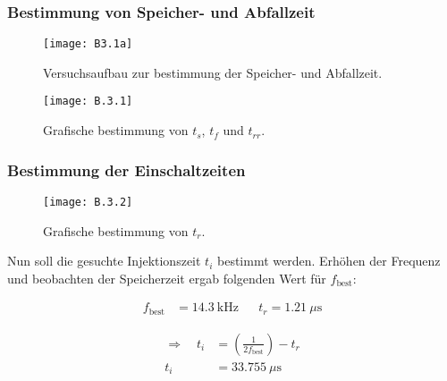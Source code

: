 \documentclass[
	a4paper, %
	12pt, %
]{CSUniSchoolLabReport}
\newcommand{\micro}{\ensuremath{\mu}}
\begin{document}
\subsubsection{Bestimmung von Speicher- und Abfallzeit}

\begin{figure}[H] %
	\centering %
	\texttt{[image: B3.1a]} %
	\caption{Versuchsaufbau zur bestimmung der Speicher- und Abfallzeit.}
	\vspace{1em}
\end{figure}

\begin{figure}[H] %
	\centering %
	\texttt{[image: B.3.1]} %
	\caption{Grafische bestimmung von $t_s$, $t_f$ und $t_{rr}$.}
\end{figure}

\subsubsection{Bestimmung der Einschaltzeiten}
\begin{figure}[H] %
	\centering %
	\texttt{[image: B.3.2]} %
	\caption{Grafische bestimmung von $t_r$.}
	\vspace{1em}
\end{figure}

Nun soll die gesuchte Injektionszeit $t_i$ bestimmt werden. Erhöhen der Frequenz und beobachten der Speicherzeit ergab folgenden Wert für $f_{\text{best}}$: 

\begin{align*}
	f_{\text{best}} &= \SI{14,3}{\kilo\hertz} 
	&& t_r = \SI{1,21}{\micro\second}
\end{align*}

\begin{align*}
	\Rightarrow\quad 
    t_i &= \left(\frac{1}{2 f_{\text{best}}}\right) - t_r \\
    t_i &= \SI{33,755}{\micro\second}
\end{align*}
\end{document}
